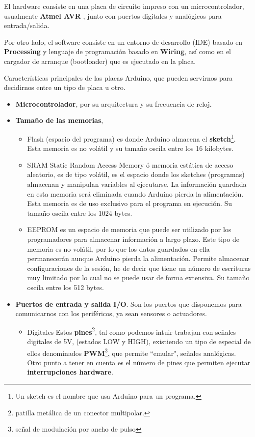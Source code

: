 \bigskip
El hardware consiste en una placa de circuito impreso con un microcontrolador, usualmente \textbf{Atmel AVR} \cite{Atmel}, junto con  puertos digitales y analógicos para entrada/salida.

\bigskip
Por otro lado, el software consiste en un entorno de desarrollo (IDE) basado en \textbf{Processing} \cite{Process}  y lenguaje de programación basado en \textbf{Wiring}, así como en el cargador de arranque (bootloader) que es ejecutado en la placa.

Características principales de las placas Arduino, que pueden servirnos para decidirnos entre un tipo de placa u otro.

\begin{itemize}
	\item \textbf{Microcontrolador}, por su arquitectura y su frecuencia de reloj.
	\item \textbf {Tamaño de las memorias},
	\begin{itemize}
		
		\item{Flash} (espacio del programa) es donde Arduino almacena el \textbf{sketch}\footnote{Un sketch es el nombre que usa Arduino para un programa.}. Esta memoria es no volátil y su tamaño oscila entre los 16 kilobytes.
		
		\item{SRAM} Static Random Access Memory ó memoria estática de acceso aleatorio,  es de tipo volátil, es el espacio donde los sketches (programas) almacenan y manipulan variables al ejecutarse. La información guardada en esta memoria será eliminada cuando Arduino pierda la alimentación. Esta memoria es de uso exclusivo para el programa en ejecución. Su tamaño oscila entre los 1024 bytes.
		
		\item{EEPROM} es un espacio de memoria que puede ser utilizado por los programadores para almacenar información a largo plazo. Este tipo de memoria es no volátil, por lo que los datos guardados en ella permanecerán aunque Arduino pierda la alimentación. Permite almacenar configuraciones de la sesión, he de decir que tiene un número de escrituras muy limitado por lo cual no se puede usar de forma extensiva. Su tamaño oscila entre los 512 bytes.
		
	\end{itemize}
	\item \textbf {Puertos de entrada y salida I/O}. Son los puertos que disponemos para comunicarnos con los periféricos, ya sean sensores o actuadores. 
	\begin{itemize}
		\item{Digitales} Estos \textbf{pines}\footnote{patilla metálica de un conector multipolar.}, tal como podemos intuir trabajan con señales digitales de 5V, (estados LOW y HIGH), existiendo un tipo de especial de ellos denominados \textbf{PWM}\footnote{señal de modulación por ancho de pulso}, que permite ``emular", señales analógicas. \newline
		Otro punto a tener en cuenta es el número de pines que permiten ejecutar  \textbf{interrupciones hardware}. 
		

\end{itemize}
\end{itemize}
